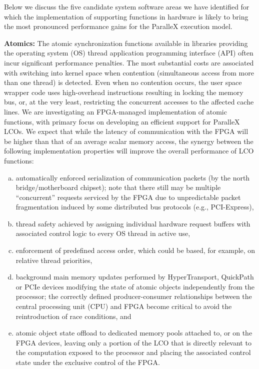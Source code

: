 \documentclass{revtex4}
\newcommand{\B}[1]{\textbf{#1}}
\begin{document}
Below we discuss the five candidate system software areas we have identified for which the
implementation of supporting functions in hardware is likely to bring
the most pronounced performance gains for the ParalleX execution model.

\B{Atomics:}
The atomic synchronization functions available in libraries
providing the operating system (OS) thread application programming interface (API) 
often incur significant performance penalties.
The most substantial costs are associated with switching into kernel space
when contention (simultaneous access from more than one thread) is
detected.
Even when no contention occurs, the user space wrapper code uses
high-overhead instructions resulting in locking the memory bus, or, at
the very least, restricting the concurrent accesses to the affected cache
lines.
We are investigating an FPGA-managed
implementation of atomic functions, with primary focus on developing
an efficient support for ParalleX LCOs.
We expect that while the latency of communication with the FPGA will
be higher than that of an average scalar memory access, the synergy between
the following implementation properties will improve the overall performance
of LCO functions:
\begin{enumerate}[(a)]
\item automatically enforced serialization of communication packets
(by the north bridge/motherboard chipset);
note that there still may be multiple ``concurrent'' requests serviced by
the FPGA due to unpredictable packet fragmentation induced by
some distributed bus protocols (e.g., PCI-Express),
\item thread safety achieved by assigning individual hardware request buffers
with associated control logic to every OS thread in active use,
\item enforcement of predefined access order, which could be based, for
example, on relative thread priorities,
\item background main memory updates performed by HyperTransport, QuickPath 
or PCIe devices
modifying the state of atomic objects independently from the processor;
the correctly defined producer-consumer relationships between the central
processing unit (CPU) and
FPGA become critical to avoid the reintroduction of race conditions, and
\item atomic object state offload to dedicated memory pools attached to,
or on the FPGA devices, leaving only a portion of the LCO that is directly
relevant to the computation exposed to the processor and placing the
associated control state under the exclusive control of the FPGA.
\end{enumerate}
\end{document}
